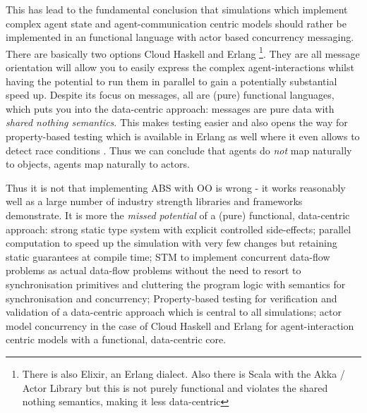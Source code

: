 This has lead to the fundamental conclusion that simulations which implement complex agent state and agent-communication centric models should rather be implemented in an functional language with actor based concurrency messaging. There are basically two options Cloud Haskell and Erlang \footnote{There is also Elixir, an Erlang dialect. Also there is Scala with the Akka / Actor Library but this is not purely functional and violates the shared nothing semantics, making it less data-centric}.
They are all message orientation will allow you to easily express the complex agent-interactions whilst having the potential to run them in parallel to gain a potentially substantial speed up. Despite its focus on messages, all are (pure) functional languages, which puts you into the data-centric approach: messages are pure data with \textit{shared nothing semantics}. This makes testing easier and also opens the way for property-based testing which is available in Erlang as well where it even allows to detect race conditions \cite{claessen_finding_2009}. Thus we can conclude that agents do \textit{not} map naturally to objects, agents map naturally to actors. 


\medskip

Thus it is not that implementing ABS with OO is wrong - it works reasonably well as a large number of industry strength libraries and frameworks demonstrate. It is more the \textit{missed potential} of a (pure) functional, data-centric approach: strong static type system with explicit controlled side-effects; parallel computation to speed up the simulation with very few changes but retaining static guarantees at compile time; STM to implement concurrent data-flow problems as actual data-flow problems without the need to resort to synchronisation primitives and cluttering the program logic with semantics for synchronisation and concurrency; Property-based testing for verification and validation of a data-centric approach which is central to all simulations; actor model concurrency in the case of Cloud Haskell and Erlang for agent-interaction centric models with a functional, data-centric core. 

